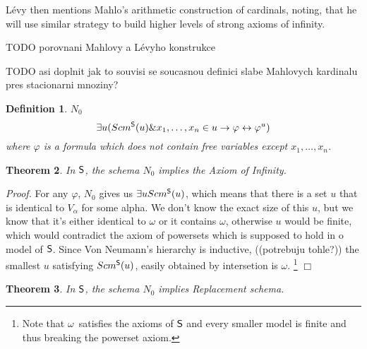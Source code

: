 \documentclass[12pt,a4paper]{article}
\newtheorem{theorem}{Theorem}[section]
\newtheorem{definition}[theorem]{Definition}
\newenvironment{proof}
{\noindent \textit{Proof.}}
{\hspace*{\fill} $\Box$}
\renewcommand{\iff}{\leftrightarrow}
\newcommand{\then}{\rightarrow}
\begin{document}
Lévy then mentions Mahlo's arithmetic construction of cardinals, noting, that he will use similar strategy to build higher levels of strong axioms of infinity. 

TODO porovnani Mahlovy a Lévyho konstrukce

TODO asi doplnit jak to souvisi se soucasnou definici slabe Mahlovych kardinalu pres stacionarni mnoziny?




\begin{definition}{$N_0$}
\begin{equation}
\exists u (Scm^{\sf{S}}(u) \& x_1, \ldots , x_n \in u \then \varphi \iff \varphi^{u})
\end{equation}
where $\varphi$ is a formula which does not contain free variables except $x_1, \ldots , x_n$.
\end{definition}


\begin{theorem}
In $\sf{S}$, the schema $N_0$ implies the Axiom of Infinity.
\end{theorem}

\begin{proof}
For any $\varphi$, $N_0$ gives us $\exists u Scm^{\sf{S}}(u)$, which means that there is a set $u$ that is identical to $V_\alpha$ for some alpha.
We don't know the exact size of this $u$, but we know that it's either identical to $\omega$ or it contains $\omega$, otherwise $u$ would be finite, which would contradict the axiom of powersets which is supposed to hold in o model of $\sf{S}$. Since Von Neumann's hierarchy is inductive, ((potrebuju tohle?)) the smallest $u$ satisfying $Scm^{\sf{S}}(u)$, easily obtained by intersetion is $\omega$. \footnote{Note that $\omega$ satisfies the axioms of $\sf{S}$ and every smaller model is finite and thus breaking the powerset axiom.}
\end{proof}


\begin{theorem}
In $\sf{S}$, the schema $N_0$ implies Replacement schema.
\end{theorem}
\end{document}
